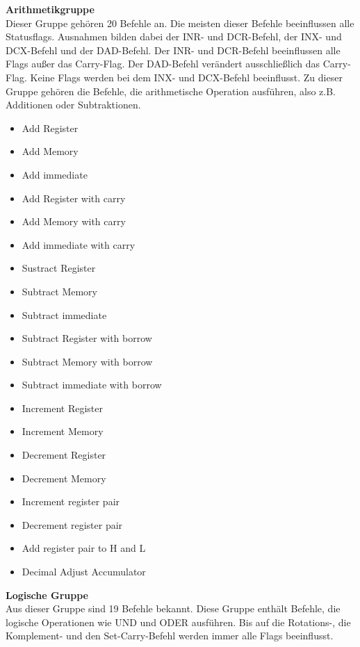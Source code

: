 \documentclass[12pt]{article}
\begin{document}
\vspace{10pt}
\noindent
\textbf{Arithmetikgruppe}\\
Dieser Gruppe gehören 20 Befehle an. Die meisten dieser Befehle beeinflussen alle Statusflags. Ausnahmen bilden dabei der INR- und DCR-Befehl, der INX- und DCX-Befehl und der DAD-Befehl. Der INR- und DCR-Befehl beeinflussen alle Flags außer das Carry-Flag. Der DAD-Befehl verändert ausschließlich das Carry-Flag. Keine Flags werden bei dem INX- und DCX-Befehl beeinflusst. Zu dieser Gruppe gehören die Befehle, die arithmetische Operation ausführen, also z.B. Additionen oder Subtraktionen.


\begin{multicols}{2}
\begin{itemize}
\item Add Register
\item Add Memory
\item Add immediate
\item Add Register with carry
\item Add Memory with carry
\item Add immediate with carry
\item Sustract Register
\item Subtract Memory
\item Subtract immediate
\item Subtract Register with borrow
\item Subtract Memory with borrow
\item Subtract immediate with borrow
\item Increment Register
\item Increment Memory
\item Decrement Register
\item Decrement Memory
\item Increment register pair
\item Decrement register pair
\item Add register pair to H and L
\item Decimal Adjust Accumulator
\end{itemize}
\end{multicols}

\vspace{10pt}
\noindent
\textbf{Logische Gruppe}\\
Aus dieser Gruppe sind 19 Befehle bekannt. Diese Gruppe enthält Befehle, die logische Operationen wie UND und ODER ausführen. Bis auf die Rotations-, die Komplement- und den Set-Carry-Befehl werden immer alle Flags beeinflusst.
\end{document}
